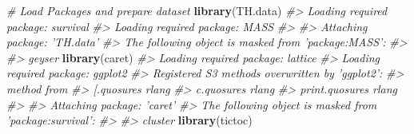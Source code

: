 \documentclass[]{book}
\newenvironment{Shaded}{\begin{snugshade}}{\end{snugshade}}
\newcommand{\CommentTok}[1]{\textcolor[rgb]{0.56,0.35,0.01}{\textit{#1}}}
\newcommand{\KeywordTok}[1]{\textcolor[rgb]{0.13,0.29,0.53}{\textbf{#1}}}
\newcommand{\NormalTok}[1]{#1}
\begin{document}
\begin{Shaded}
\begin{Highlighting}[]
\CommentTok{# Load Packages and prepare dataset}
\KeywordTok{library}\NormalTok{(TH.data)}
\CommentTok{#> Loading required package: survival}
\CommentTok{#> Loading required package: MASS}
\CommentTok{#> }
\CommentTok{#> Attaching package: 'TH.data'}
\CommentTok{#> The following object is masked from 'package:MASS':}
\CommentTok{#> }
\CommentTok{#>     geyser}
\KeywordTok{library}\NormalTok{(caret)}
\CommentTok{#> Loading required package: lattice}
\CommentTok{#> Loading required package: ggplot2}
\CommentTok{#> Registered S3 methods overwritten by 'ggplot2':}
\CommentTok{#>   method         from }
\CommentTok{#>   [.quosures     rlang}
\CommentTok{#>   c.quosures     rlang}
\CommentTok{#>   print.quosures rlang}
\CommentTok{#> }
\CommentTok{#> Attaching package: 'caret'}
\CommentTok{#> The following object is masked from 'package:survival':}
\CommentTok{#> }
\CommentTok{#>     cluster}
\KeywordTok{library}\NormalTok{(tictoc)}


\end{Highlighting}
\end{Shaded}
\end{document}
